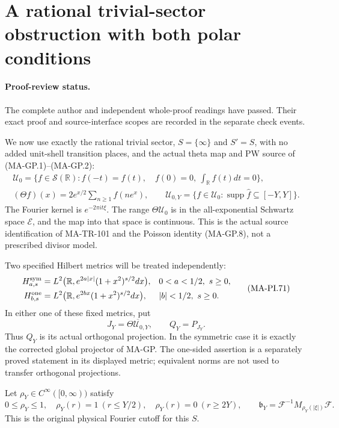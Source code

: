 \section{A rational trivial-sector obstruction with both polar conditions}
\label{sec:rational-physical-projection-obstruction}

\paragraph{Proof-review status.}
The complete author and independent whole-proof readings have
passed. Their exact proof and source-interface scopes are recorded
in the separate check events.

We now use exactly the rational trivial sector, $S=\{\infty\}$
and $S'=S$, with no added unit-shell transition places,
and the actual theta map and PW source of (MA-GP.1)--(MA-GP.2):
\[
 \begin{gathered}
 \mathcal U_0=\{f\in\mathcal S(\mathbb R): f(-t)=f(t),\quad
                         f(0)=0,\ \int_{\mathbb R}f(t)dt=0\},\\
 (\Theta f)(x)=2e^{x/2}\sum_{n\ge1}f(ne^x),\qquad
 \mathcal U_{0,Y}=\{f\in\mathcal U_0:
                  \operatorname{supp}\widehat f\subseteq[-Y,Y]\}.
 \end{gathered}
 \tag{MA-PI.70}
\]
The Fourier kernel is $e^{-2\pi it\xi}$. The range
$\Theta\mathcal U_0$ is in the all-exponential Schwartz
space $\mathcal E$, and the map into that space is continuous.
This is the actual source identification of MA-TR-101 and
the Poisson identity (MA-GP.8), not a prescribed divisor model.

Two specified Hilbert metrics will be treated independently:
\[
 \begin{aligned}
 H^{\rm sym}_{a,s}
  &=L^2\bigl(\mathbb R,e^{2a|x|}(1+x^2)^{s/2}dx\bigr),
             &&0<a<1/2,\ s\ge0,\\
 H^{\rm one}_{b,s}
  &=L^2\bigl(\mathbb R,e^{2bx}(1+x^2)^{s/2}dx\bigr),
             &&|b|<1/2,\ s\ge0.
 \end{aligned}
 \tag{MA-PI.71}
\]
In either one of these fixed metrics, put
\[
 J_Y=\overline{\Theta\mathcal U_{0,Y}},\qquad Q_Y=P_{J_Y}.
 \tag{MA-PI.72}
\]
Thus $Q_Y$ is its actual orthogonal projection. In the symmetric
case it is exactly the corrected global projector of MA-GP.
The one-sided assertion is a separately proved statement in
its displayed metric; equivalent norms are not used to transfer
orthogonal projections.

Let $\rho_Y\in C^\infty([0,\infty))$ satisfy
\[
 0\le\rho_Y\le1,\quad \rho_Y(r)=1\ (r\le Y/2),\quad
 \rho_Y(r)=0\ (r\ge2Y),\qquad
 \mathfrak b_Y=\mathcal F^{-1}M_{\rho_Y(|\xi|)}\mathcal F.
 \tag{MA-PI.73}
\]
This is the original physical Fourier cutoff for this $S$.

